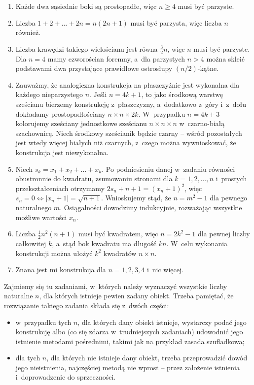 {{{   \begin{enumerate}[format=\Magenta,itemsep=0pt,leftmargin=0pt,itemindent=12pt,labelwidth=6pt,labelsep=6pt,itemsep=2pt]
\item Każde dwa sąsiednie boki są prostopadłe, więc $n\ge4$ musi być parzyste.
\item Liczba $1+2+\ldots+2n=n(2n+1)$ musi być parzysta, więc liczba $n$ również.
\item Liczba krawędzi takiego wielościanu jest równa $\frac32n$, więc $n$ musi być parzyste. Dla $n=4$ mamy czworościan foremny, a~dla parzystych $n>4$ można skleić podstawami dwa przystające prawidłowe ostrosłupy $(n/2)$-kątne.
\item Zauważmy, że analogiczna konstrukcja na płaszczyźnie jest wykonalna dla każdego nieparzystego $n$. Jeśli $n=4k+1$, to jako środkową warstwę sześcianu bierzemy konstrukcję z~płaszczyzny, a~dodatkowo z~góry i~z~dołu dokładamy prostopadłościany $n\times n\times 2k$. W~przypadku $n=4k+3$ kolorujemy sześciany jednostkowe sześcianu $n\times n\times n$ w~czarno-białą szachownicę. Niech środkowy sześcianik będzie czarny -- wśród pozostałych jest wtedy więcej białych niż czarnych, z~czego można wywnioskować, że konstrukcja jest niewykonalna.
\item Niech $s_k=x_1+x_2+\ldots+x_k$. Po podniesieniu danej w~zadaniu równości obustronnie do kwadratu, zsumowaniu stronami dla $k=1,2,\ldots,n$ i~prostych przekształceniach otrzymamy $2s_n+n+1 = (x_n+1)^2$, więc $s_n=0 \iff |x_n+1|=\sqrt{n+1}$. Wnioskujemy stąd, że $n=m^2-1$ dla pewnego naturalnego $m$. Osiągalności dowodzimy indukcyjnie, rozważając wszystkie możliwe wartości $x_n$.
\item Liczba $\frac12n^2(n+1)$ musi być kwadratem, więc $n=2k^2-1$ dla pewnej
liczby całkowitej $k$, a~stąd bok kwadratu ma długość $kn$. W~celu wykonania konstrukcji można ułożyć $k^2$ kwadratów $n\times n$.
\item Znana jest mi konstrukcja dla $n=1,2,3,4$ i~nic więcej.
\end{enumerate}
}}}%
Zajmiemy się tu zadaniami, w~których należy wyznaczyć wszystkie liczby naturalne
$n$, dla których istnieje pewien zadany obiekt. Trzeba pamiętać, że rozwiązanie takiego
zadania składa się z~dwóch części:
\begin{itemize}
\item w~przypadku tych $n$, dla których dany obiekt istnieje, wystarczy podać jego konstrukcję albo (co się zdarza w~trudniejszych zadaniach) udowodnić jego istnienie metodami pośrednimi, takimi jak na przykład zasada szufladkowa;
\item dla tych $n$, dla których nie istnieje dany obiekt, trzeba przeprowadzić dowód jego nieistnienia, najczęściej metodą nie wprost -- przez założenie istnienia i~doprowadzenie do sprzeczności.
\end{itemize}
